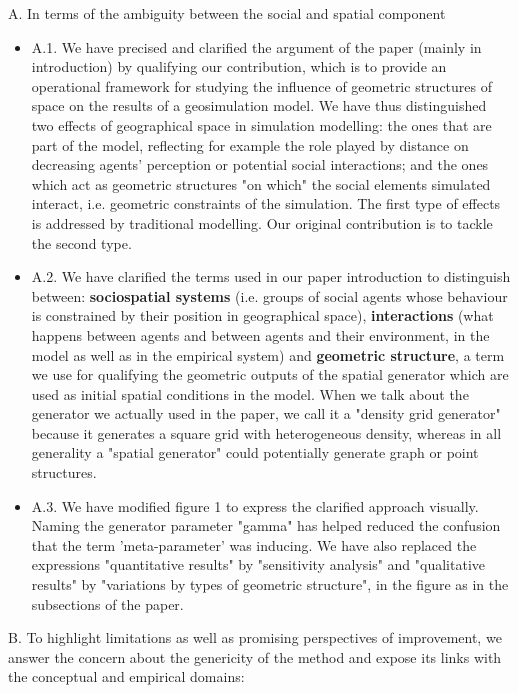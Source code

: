 \documentclass[11pt,a4paper,sans]{moderncv}        %
\begin{document}
 \medskip
A. In terms of the ambiguity between the social and spatial component 
\begin{itemize}
\item A.1. We have precised and clarified the argument of the paper (mainly in introduction) by qualifying our contribution, which is to provide an operational framework for studying the influence of geometric structures of space on the results of a geosimulation model. We have thus distinguished two effects of geographical space in simulation modelling: the ones that are part of the model, reflecting for example the role played by distance on decreasing agents' perception or potential social interactions; and the ones which act as geometric structures "on which" the social elements simulated interact, i.e. geometric constraints of the simulation. The first type of effects is addressed by traditional modelling. Our original contribution is to tackle the second type.
 
\item A.2. We have clarified the terms used in our paper introduction to distinguish between: \textbf{sociospatial systems} (i.e. groups of social agents whose behaviour is constrained by their position in geographical space), \textbf{interactions} (what happens between agents and between agents and their environment, in the model as well as in the empirical system) and \textbf{geometric structure}, a term we use for qualifying the geometric outputs of the spatial generator which are used as initial spatial conditions in the model. When we talk about the generator we actually used in the paper, we call it a "density grid generator" because it generates a square grid with heterogeneous density, whereas in all generality a "spatial generator" could potentially generate graph or point structures.

 \item A.3. We have modified figure 1 to express the clarified approach visually. Naming the generator parameter "gamma" has helped reduced the confusion that the term 'meta-parameter' was inducing. We have also replaced the expressions "quantitative results" by "sensitivity analysis" and "qualitative results" by "variations by types of geometric structure", in the figure as in the subsections of the paper.
\end{itemize}

 \medskip
B. To highlight limitations as well as promising perspectives of improvement, we answer the concern about the genericity of the method and expose its links with the conceptual and empirical domains:
\end{document}

